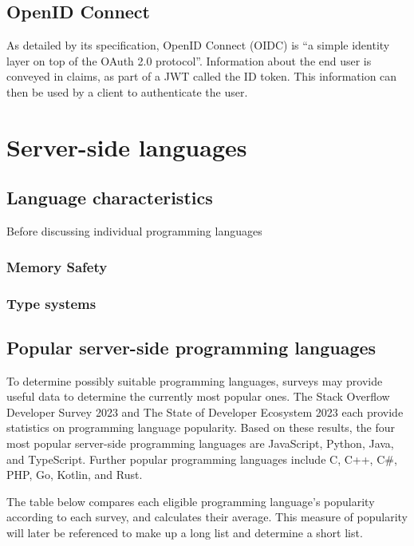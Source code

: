 \subsection{OpenID Connect}
As detailed by its specification, OpenID Connect (OIDC) is ``a simple identity layer on top of the OAuth 2.0 protocol''. Information about the end user is conveyed in claims, as part of a JWT called the ID token. This information can then be used by a client to authenticate the user. \autocite{Sakimura2014} 

\section{Server-side languages}
\subsection{Language characteristics}
Before discussing individual programming languages
\subsubsection{Memory Safety}

\subsubsection{Type systems}

\subsection{Popular server-side programming languages}
To determine possibly suitable programming languages, surveys may provide useful data to determine the currently most popular ones. The Stack Overflow Developer Survey 2023 \autocite{StackOverflow2023} and The State of Developer Ecosystem 2023 \autocite{JetBrains2023} each provide statistics on programming language popularity. Based on these results, the four most popular server-side programming languages are JavaScript, Python, Java, and TypeScript. Further popular programming languages include C, C++, C\#, PHP, Go, Kotlin, and Rust.

The table below compares each eligible programming language's popularity according to each survey, and calculates their average. This measure of popularity will later be referenced to make up a long list and determine a short list.

